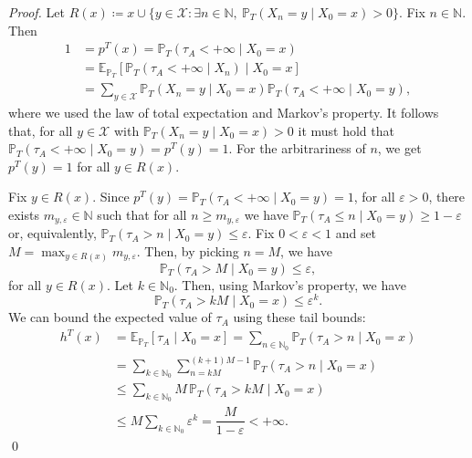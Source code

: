 \documentclass[10pt,a4paper]{amsart}
\newcommand{\EE}{\mathbb{E}}
\newcommand{\N}{\mathbb{N}}
\newcommand{\PP}{\mathbb{P}}
\newcommand{\X}{\mathcal{X}}
\begin{document}
\begin{proof}
    Let $R(x)\coloneqq x \cup \{y\in \X: \exists n\in \N, \ \PP_T(X_n=y \mid X_0=x)>0\}.$ Fix $n\in \N$. Then
    \begin{align}
        1&=p^T(x)=\PP_T(\tau_A<+\infty\mid X_0=x)\nonumber\\
        &= \EE_{\PP_T}\left[\PP_T(\tau_A<+\infty \mid X_n) \mid X_0=x \right] \nonumber\\
        &=\sum_{y\in \X}\PP_T(X_n=y\mid X_0=x)\PP_T(\tau_A<+\infty\mid X_0=y), \label{rompicapo}
    \end{align}
    where we used the law of total expectation and Markov's property. It follows that, for all $y\in \X$ with $\PP_T(X_n=y\mid X_0=x)>0$ it must hold that $\PP_T(\tau_A<+\infty\mid X_0=y)=p^T(y)=1$. For the arbitrariness of $n$, we get $p^T(y)=1$ for all $y\in R(x)$.

    Fix $y\in R(x)$. Since $p^T(y)= \PP_T(\tau_A<+\infty\mid X_0=y)=1$, for all $\varepsilon>0$, there exists $m_{y,\varepsilon}\in\N$ such that for all $n\ge m_{y,\varepsilon}$ we have $\PP_T(\tau_A\le n\mid X_0=y)\ge 1-\varepsilon$ or, equivalently, $\PP_T(\tau_A> n\mid X_0=y)\le\varepsilon$.
Fix $0<\varepsilon<1$ and set $M=\max_{y\in R(x)} m_{y,\varepsilon}$. Then, by picking $n=M$, we have
\[
\PP_T(\tau_A> M\mid X_0=y)\le\varepsilon,
\]
for all $y\in R(x)$.
Let $k\in \N_0$. Then, using Markov's property, we have
\[
\PP_T(\tau_A>kM\mid X_0=x)\le\varepsilon^k.
\]
We can bound the expected value of $\tau_A$ using these tail bounds:
\begin{align*}
    h^T(x)&=\EE_{\PP_T}[\tau_A\mid X_0=x] = {\sum_{n\in \N_0}\PP_T(\tau_A>n\mid X_0=x)}\\
&= \sum_{k\in \N_0}\sum_{n=kM}^{(k+1)M-1}\PP_T(\tau_A>n\mid X_0=x)\\
&\le \sum_{k\in \N_0} M\,\PP_T(\tau_A>kM\mid X_0=x)\\
&\le M\sum_{k\in \N_0}\varepsilon^k= \dfrac{M}{1-\varepsilon}<+\infty. 
\end{align*}
\qed
\end{proof}
\end{document}
